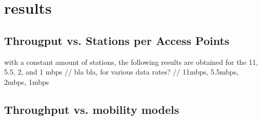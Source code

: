 \chapter{results} 

\section{Througput vs. Stations per Access Points}

with a constant amount of stations, the following results are obtained for the 11, 5.5, 2, and 1 mbps 
// bla bla, for various data rates?
// 11mbps, 5.5mbps, 2mbps, 1mbps




\section{Throughput vs. mobility models  }

